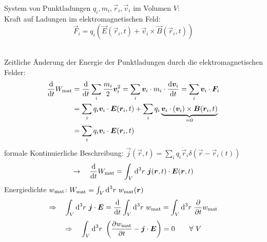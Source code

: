 \begin{minipage}{.7\linewidth}
	System von Punktladungen $ q_i, m_i, \vec{r}_i, \vec{v}_i $ im Volumen $ V $:\\[5pt]
	Kraft auf Ladungen im elektromagnetischen Feld:
	\begin{equation*}
	\vec{F}_i = q_i \left(\vec{E}(\vec{r}_i, t) + \vec{v}_i \times \vec{B}(\vec{r}_i, t) \right)
	\end{equation*}
\end{minipage}%
\begin{minipage}{.3\linewidth}
	\centering
	\vspace{5pt}
\end{minipage}%
\\
Zeitliche Änderung der Energie der Punktladungen durch die elektromagnetischen Felder:
\begin{align*}
\frac{\textrm{d} }{\textrm{d} t} W_{\textrm{mat}} &= \frac{\textrm{d} }{\textrm{d} t} \sum_i \frac{m_i}{2} \bm{v}_i^2 = \sum_i \bm{v}_i \cdot m_i \cdot \frac{\textrm{d} \bm{v}_i}{\textrm{d} t} = \sum_i \bm{v}_i \cdot \bm{F}_i\\
&= \sum_i q_i \bm{v}_i \cdot \bm{E}(\bm{r}_i, t) + \sum_i q_i \underbrace{ \bm{v}_i \cdot (\bm{v}_i) \times \bm{B}(\bm{r}_i, t) }_{=0}\\
&= \sum_i q_i \bm{v}_i \cdot \bm{E}(\bm{r}_i, t)
\end{align*}
formale Kontinuierliche Beschreibung: $ \vec{j}(\vec{r},t) = \sum_i q_i \dot{\vec{r}}_i \delta(\vec{r} - \vec{r}_i(t)) $
\begin{equation*}
\rightarrow \quad \frac{\textrm{d} }{\textrm{d} t} W_{\textrm{mat}} = \int_V \textrm{d}^3 r \ \bm{j}(\bm{r},t) \cdot \bm{E}(\bm{r},t)
\end{equation*}
Energiedichte $ w_{\textrm{mat}} $: $ W_{\textrm{mat}} = \int_V \textrm{d}^3 r \ w_{\textrm{mat}} (\bm{r}) $
\begin{equation*}
\Rightarrow \quad \int_V \dd^3 r \ \vec{j} \cdot \vec{E} = \prd{}{t} \int_V \dd^3 r \ w_{\tx{mat}} = \int_V \dd^3 r \ \prt{}{t} w_{\tx{mat}}
\end{equation*}
\begin{equation*}
\Rightarrow \quad \int_V \dd^3 r \ \left(\prt{w_{\tx{mat}}}{t} - \vec{j} \cdot \vec{E} \right) = 0 \qquad \forall \ V
\end{equation*}
